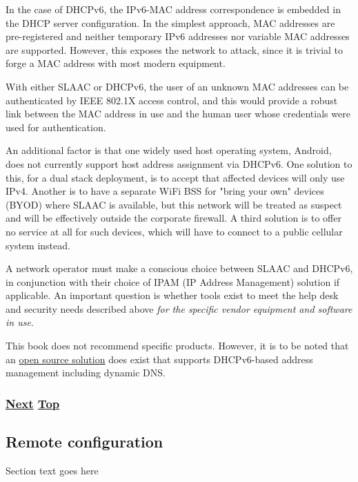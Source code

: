 \documentclass[
]{article}
\begin{document}
In the case of DHCPv6, the IPv6-MAC address correspondence is embedded
in the DHCP server configuration. In the simplest approach, MAC
addresses are pre-registered and neither temporary IPv6 addresses nor
variable MAC addresses are supported. However, this exposes the network
to attack, since it is trivial to forge a MAC address with most modern
equipment.

With either SLAAC or DHCPv6, the user of an unknown MAC addresses can be
authenticated by IEEE 802.1X access control, and this would provide a
robust link between the MAC address in use and the human user whose
credentials were used for authentication.

An additional factor is that one widely used host operating system,
Android, does not currently support host address assignment via DHCPv6.
One solution to this, for a dual stack deployment, is to accept that
affected devices will only use IPv4. Another is to have a separate WiFi
BSS for "bring your own" devices (BYOD) where SLAAC is available, but
this network will be treated as suspect and will be effectively outside
the corporate firewall. A third solution is to offer no service at all
for such devices, which will have to connect to a public cellular system
instead.

A network operator must make a conscious choice between SLAAC and
DHCPv6, in conjunction with their choice of IPAM (IP Address Management)
solution if applicable. An important question is whether tools exist to
meet the help desk and security needs described above \emph{for the
specific vendor equipment and software in use}.

This book does not recommend specific products. However, it is to be
noted that an \href{https://www.isc.org/kea/}{open source solution} does
exist that supports DHCPv6-based address management including dynamic
DNS.

\subsubsection{\texorpdfstring{\hyperref[remote-configuration]{Next}
\hyperref[management-and-operations]{Top}}{Next Top}}\label{next-top-4}

\pagebreak

\subsection{Remote configuration}\label{remote-configuration}

Section text goes here
\end{document}
